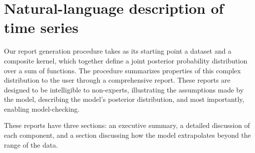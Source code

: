 \documentclass[twoside]{article}
\begin{document}
\section{Natural-language description of time series}
\label{sec:examples}

Our report generation procedure takes as its starting point a dataset and a composite kernel, which together define a joint posterior probability distribution over a sum of functions.
The procedure summarizes properties of this complex distribution to the user through a comprehensive report.
%
These reports are designed to be intelligible to non-experts, illustrating the assumptions made by the model, describing the model's posterior distribution, and most importantly, enabling model-checking.
%
%
%
%
%

These reports have three sections: an executive summary, a detailed discussion of each component, and a section discussing how the model extrapolates beyond the range of the data.
\end{document}
